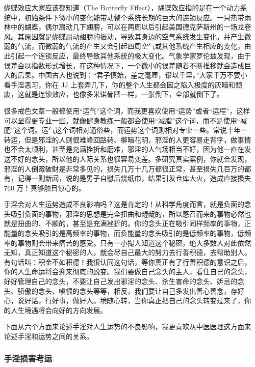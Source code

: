 蝴蝶效应大家应该都知道（The Butterfly Effect），蝴蝶效应指的是在一个动力系统中，初始条件下微小的变化能带动整个系统长期的巨大的连锁反应。一只热带雨林中的蝴蝶，偶尔扇动几下翅膀，可以在两周以后引起美国德克萨斯州的一场龙卷风。其原因就是蝴蝶扇动翅膀的振动，导致其身边的空气系统发生变化，并产生微弱的气流，而微弱的气流的产生又会引起四周空气或其他系统产生相应的变化，由此引起一个连锁反应，最终导致其他系统的极大变化。气象学家罗伦兹发现，由于误差会以指数形式增长，在这种情况下，一个微小的误差随着不断推移就会造成巨大的后果。中国古人也说到：“君子慎始，差之毫厘，谬以千里。”大家千万不要小看手淫恶习，你在 JJ 上套弄几下，你的整个人生都会因之陷入极度的灰暗和颓废，这就是连锁效应，也像多米诺骨牌一样，一张倒下，全部就倒下了。

很多戒色文章一般都使用“运气”这个词，而我更喜欢使用“运势”或者“运程”，这样可以显得更专业一些，就像健身教练一般都会使用“减脂”这个词，而不是使用“减肥”这个词。运气这个词相对通俗些，而运势这个词则相对专业一些。常说十年一转运，但是邪淫的人则很难峰回路转、柳暗花明，邪淫的人更容易走背字，做事情也不会太顺利，甚至是充满挫折和磨难，邪淫的人气场相当不好，因为他一直在发送不好的念头，所以他的人际关系也很容易变差。多研究真实案例，你就会发现，邪淫的人倒霉破财是非常多见的，损失几万十几万都很正常，甚至损失几百万的都有，记得一则新闻，说的是男子自慰后烧纸巾，结果引发仓库大火，造成直接损失 760 万！真够触目惊心的。

手淫会对人生运势造成不良影响吗？这是肯定的！从科学角度而言，就是负面的念头吸引负面的事物，邪淫的思想是完全扭曲和龌龊的，所以感召而来的事物必然也就是扭曲的、不顺的，甚至是充满挫折的。你的念头正在吸引同样频率的事物，正能量的念头吸引的是高频率的事物，而负能量的念头吸引的是低频率的事物，低频率的事物则会带来痛苦的感受。只有一小撮人知道这个秘密，绝大多数人对此依然无知，真正知道这个秘密的人，就会尽自己最大的努力去行善积德，去帮助别人。有句话叫：积金不如积德！我很认同这句话，等你真正有了行善积德的意识之后，你的人生命运将会迎来彻底的蜕变。我们要做自己念头的主人，看住自己的念头，好好管理自己的念头，不要让自己发出邪淫的念头、杀生害命的念头、妒忌的念头、骄傲的念头、嗔恨的念头等等，相反，我们要让自己多发出善心善念，存好心，说好话，行好事，做好人。境随心转，当你真正把自己的念头转变过来了，你的人生境遇将会向好的方向发展。

下面从六个方面来论述手淫对人生运势的不良影响，我更喜欢从中医医理这方面来论述手淫和运势之间的关系。

\subsubsection{手淫损害考运}

